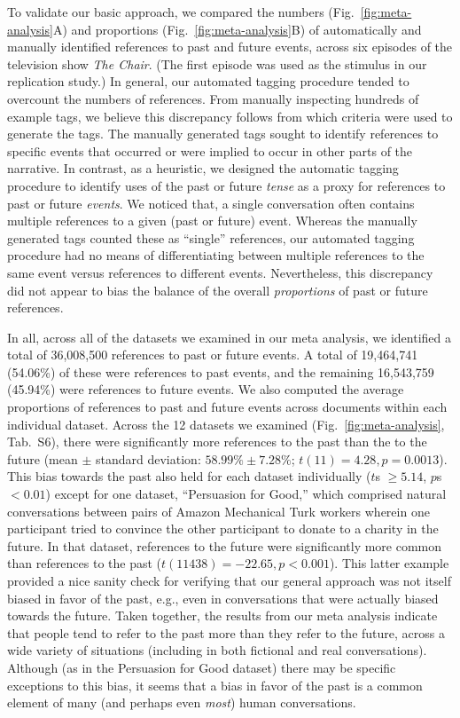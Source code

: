 \documentclass[10pt]{article}
\newcommand{\metaAnalysisDatasets}{S6}
\begin{document}
To validate our basic approach, we compared the numbers
(Fig.~\ref{fig:meta-analysis}A) and proportions (Fig.~\ref{fig:meta-analysis}B)
of automatically and manually identified references to past and future events,
across six episodes of the television show \textit{The Chair}. (The first
episode was used as the stimulus in our replication study.) In general, our
automated tagging procedure tended to overcount the numbers of references. From
manually inspecting hundreds of example tags, we believe this discrepancy
follows from which criteria were used to generate the tags. The manually
generated tags sought to identify references to specific events that occurred
or were implied to occur in other parts of the narrative. In contrast, as a
heuristic, we designed the automatic tagging procedure to identify uses of the
past or future \textit{tense} as a proxy for references to past or future
\textit{events}. We noticed that, a single conversation often contains multiple
references to a given (past or future) event. Whereas the manually generated
tags counted these as ``single'' references, our automated tagging procedure
had no means of differentiating between multiple references to the same event
versus references to different events. Nevertheless, this discrepancy did not
appear to bias the balance of the overall \textit{proportions} of past or
future references.

In all, across all of the datasets we examined in our meta analysis, we
identified a total of 36,008,500 references to past or future events. A total
of 19,464,741 (54.06\%) of these were references to past events, and the
remaining 16,543,759 (45.94\%) were references to future events. We also
computed the average proportions of references to past and future events across
documents within each individual dataset. Across the 12 datasets we examined
(Fig.~\ref{fig:meta-analysis}, Tab.~\metaAnalysisDatasets), there were significantly more
references to the past than the to the future (mean $\pm$ standard deviation:
$58.99\% \pm 7.28\%$; $t(11) = 4.28, p = 0.0013$). This bias towards the past
also held for each dataset individually ($t$s $\geq 5.14$, $p$s $< 0.01$)
except for one dataset, ``Persuasion for Good,'' which comprised natural
conversations between pairs of Amazon Mechanical Turk workers wherein one
participant tried to convince the other participant to donate to a charity in
the future. In that dataset, references to the future were significantly more
common than references to the past ($t(11438) = -22.65, p < 0.001$). This
latter example provided a nice sanity check for verifying that our general
approach was not itself biased in favor of the past, e.g., even in
conversations that were actually biased towards the future. Taken together, the
results from our meta analysis indicate that people tend to refer to the past
more than they refer to the future, across a wide variety of situations
(including in both fictional and real conversations). Although (as in the
Persuasion for Good dataset) there may be specific exceptions to this bias, it
seems that a bias in favor of the past is a common element of many (and perhaps
even \textit{most}) human conversations.
\end{document}
